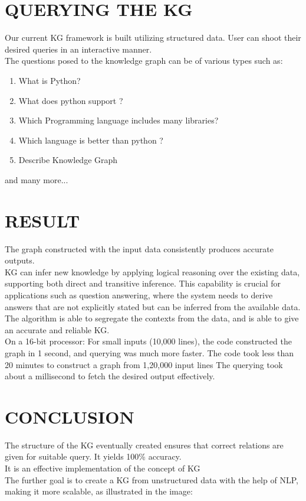 \documentclass[conference]{IEEEtran}
\begin{document}
\section{QUERYING THE KG}
Our current KG framework is built utilizing structured data. User can shoot their desired queries in an interactive manner. 
\\
The questions posed to the knowledge graph can be of various types such as:
\begin{enumerate}
    \item What is Python?
    \item What does python support ?
    \item Which Programming language includes many libraries?
    \item Which language is better than python ?
    \item Describe Knowledge Graph
\end{enumerate}
and many more...


\section*{RESULT}
The graph constructed with the input data consistently produces accurate outputs.
\\
KG can infer new knowledge by applying logical reasoning over the existing data, supporting both direct and transitive inference. This capability is crucial for applications such as question answering, where the system needs to derive answers that are not explicitly stated but can be inferred from the available data.
\\
The algorithm is able to segregate the contexts from the data, and is able to give an accurate and reliable KG.
\\
On a 16-bit processor:
For small inputs (10,000 lines), the code constructed the graph in 1 second, and querying was much more faster.
The code took less than 20 minutes to construct a graph from 1,20,000 input lines 
The querying took about a millisecond to fetch the desired output effectively.

\section*{CONCLUSION}
The structure of the KG eventually created ensures that correct relations are given for suitable query. It yields 100\% accuracy.
\\
It is an effective implementation of the concept of KG
\\
The further goal is to create a KG from unstructured data with the help of NLP, making it more scalable, as illustrated in the image:
\end{document}
